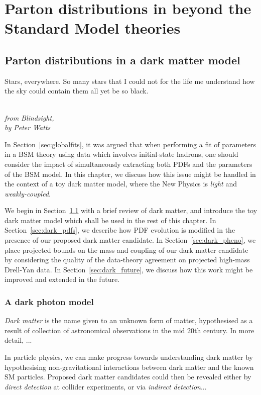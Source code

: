 \documentclass[withindex,glossary]{cam-thesis}
\begin{document}
\newpage
\part{Parton distributions in beyond the Standard Model theories}
\chapter{Parton distributions in a dark matter model}
\label{chap:darkphoton}

\epigraph{Stars, everywhere. So many stars that I could not for the life me understand how the sky could contain them all yet be so black.}{\textit{\\ from Blindsight, \\ by Peter Watts}}

In Section~\ref{sec:globalfits}, it was argued that when performing a fit of parameters in a BSM theory using data which involves initial-state hadrons, one should consider the impact of simultaneously extracting both PDFs and the parameters of the BSM model. In this chapter, we discuss how this issue might be handled in the context of a toy dark matter model, where the New Physics is \textit{light} and \textit{weakly-coupled}.

We begin in Section~\ref{sec:darkphoton} with a brief review of dark matter, and introduce the toy dark matter model which shall be used in the rest of this chapter. In Section~\ref{sec:dark_pdfs}, we describe how PDF evolution is modified in the presence of our proposed dark matter candidate. In Section~\ref{sec:dark_pheno}, we place projected bounds on the mass and coupling of our dark matter candidate by considering the quality of the data-theory agreement on projected high-mass Drell-Yan data. In Section~\ref{sec:dark_future}, we discuss how this work might be improved and extended in the future.


\section{A dark photon model}
\label{sec:darkphoton}

\textit{Dark matter} is the name given to an unknown form of matter, hypothesised as a result of collection of astronomical observations in the mid $20$th century. In more detail, ...

In particle physics, we can make progress towards understanding dark matter by hypothesising non-gravitational interactions between dark matter and the known SM particles. Proposed dark matter candidates could then be revealed either by \textit{direct detection} at collider experiments, or via \textit{indirect detection}... 
\end{document}
